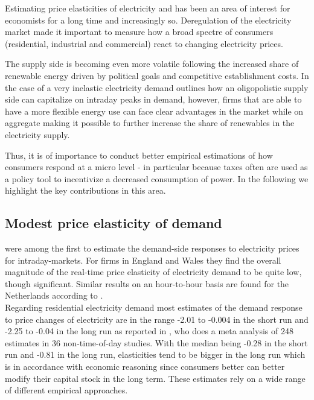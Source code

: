 \label{sec:background}
Estimating price elasticities of electricity and has been an area of interest for economists for a long time and increasingly so. Deregulation of the electricity market made it important to measure how a broad spectre of consumers (residential, industrial and commercial) react to changing electricity prices.


The supply side is becoming even more volatile following the increased share of renewable energy driven by political goals and competitive establishment costs. In the case of a very inelastic electricity demand \citet{wolak2001impact} outlines how an oligopolistic supply side can capitalize on intraday peaks in demand, however, firms that are able to have a more flexible energy use can face clear advantages in the market while on aggregate making it possible to further increase the share of renewables in the electricity supply. \par\vspace{-1em}
Thus, it is of importance to conduct better empirical estimations of how consumers respond at a micro level - in particular because taxes often are used as a policy tool to incentivize a decreased consumption of power. In the following we highlight the key contributions in this area.

\subsection{Modest price elasticity of demand}
\label{subsec:b_results}
\citet{patrick2001estimating} were among the first to estimate the demand-side responses to electricity prices for intraday-markets. For firms in England and Wales they find the overall magnitude of the real-time price elasticity of electricity demand to be quite low, though significant. Similar results on an hour-to-hour basis are found for the Netherlands according to \citet{lijesen2007real}.\smallskip \\

Regarding residential electricity demand most estimates of the demand response to price changes of electricity are in the range -2.01 to -0.004 in the short run and -2.25 to -0.04 in the long run as reported in \citet{espey2004turning}, who does a meta analysis of 248 estimates in 36 non-time-of-day studies. With the median being -0.28 in the short run and -0.81 in the long run, elasticities tend to be bigger in the long run which is in accordance with economic reasoning since consumers better can better modify their capital stock in the long term. These estimates rely on a wide range of different empirical approaches.

